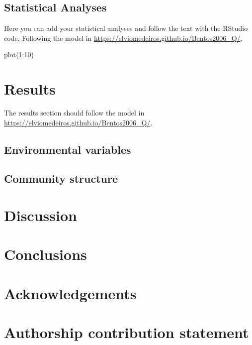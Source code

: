 \documentclass[
  american,
  letterpaper,
  DIV=11,
  numbers=noendperiod]{scrartcl}
\newenvironment{Shaded}{}{}
\newcommand{\DecValTok}[1]{\textcolor[rgb]{0.25,0.63,0.44}{#1}}
\newcommand{\FunctionTok}[1]{\textcolor[rgb]{0.02,0.16,0.49}{#1}}
\newcommand{\NormalTok}[1]{#1}
\newcommand{\SpecialCharTok}[1]{\textcolor[rgb]{0.25,0.44,0.63}{#1}}
\begin{document}
\subsection{Statistical Analyses}\label{statistical-analyses}

Here you can add your statistical analyses and follow the text with the
RStudio code. Following the model in
\url{https://elviomedeiros.github.io/Bentos2006_Q/}.

\begin{Shaded}
\begin{Highlighting}[numbers=left,,]
\FunctionTok{plot}\NormalTok{(}\DecValTok{1}\SpecialCharTok{:}\DecValTok{10}\NormalTok{)}
\end{Highlighting}
\end{Shaded}

\section{Results}\label{results}

The results section should follow the model in
\url{https://elviomedeiros.github.io/Bentos2006_Q/}.

\subsection{Environmental variables}\label{environmental-variables}

\subsection{Community structure}\label{community-structure}

\section{Discussion}\label{discussion}

\section*{Conclusions}\label{conclusions}

\section*{Acknowledgements}\label{acknowledgements}

\section*{Authorship contribution
statement}\label{authorship-contribution-statement}
\end{document}
